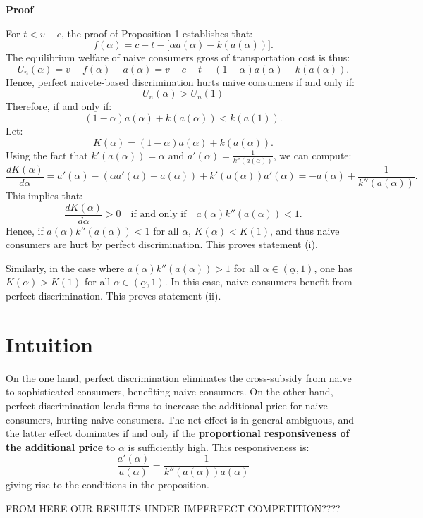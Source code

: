 \documentclass[12pt, oneside]{article}   	%
\begin{document}
\textbf{Proof}  

For \( t < v - c \), the proof of Proposition 1 establishes that:
\[
f(\alpha) = c + t - \big[\alpha a(\alpha) - k(a(\alpha))\big].
\]
The equilibrium welfare of naive consumers gross of transportation cost is thus:
\[
U_{n} (\alpha) = v - f(\alpha) - a(\alpha) = v - c - t - (1 - \alpha)a(\alpha) - k(a(\alpha)).
\]
Hence, perfect naivete-based discrimination hurts naive consumers if and only if:
\[
U_{n} (\alpha) > U_{n} (1) 
\]
Therefore, if and only if:
\[
(1 - \alpha)a(\alpha) + k(a(\alpha)) < k(a(1)).
\]
Let:
\[
K(\alpha) = (1 - \alpha)a(\alpha) + k(a(\alpha)).
\]
Using the fact that \( k'(a(\alpha)) = \alpha \) and \( a'(\alpha) = \frac{1}{k''(a(\alpha))} \), we can compute:
\[
\frac{dK(\alpha)}{d\alpha} = a'(\alpha) - (\alpha a'(\alpha) + a(\alpha)) + k'(a(\alpha)) a'(\alpha) = -a(\alpha) + \frac{1}{k''(a(\alpha))}.
\]
This implies that:
\[
\frac{dK(\alpha)}{d\alpha} > 0 \quad \text{if and only if} \quad a(\alpha)k''(a(\alpha)) < 1.
\]
Hence, if \( a(\alpha)k''(a(\alpha)) < 1 \) for all \( \alpha \), \( K(\alpha) < K(1) \), and thus naive consumers are hurt by perfect discrimination. This proves statement (i).  

Similarly, in the case where \( a(\alpha)k''(a(\alpha)) > 1 \) for all \( \alpha \in (\underline{\alpha}, 1) \), one has \( K(\alpha) > K(1) \) for all \( \alpha \in (\underline{\alpha}, 1) \). In this case, naive consumers benefit from perfect discrimination. This proves statement (ii).

\section*{Intuition}
On the one hand, perfect discrimination eliminates the cross-subsidy from naive to sophisticated consumers, benefiting naive
consumers. On the other hand, perfect discrimination leads firms to increase the additional price for naive consumers, hurting naive consumers. The net effect is in general ambiguous, and the latter effect dominates if and only if the \textbf{proportional responsiveness of the additional price} to \( \alpha \) is sufficiently high. This responsiveness is:
\[
 \frac{a'(\alpha)}{a(\alpha)} =  \frac{1}{k''(a(\alpha)) a(\alpha)}
\]
giving rise to the conditions in the proposition.



FROM HERE OUR RESULTS UNDER IMPERFECT COMPETITION????
\end{document}
